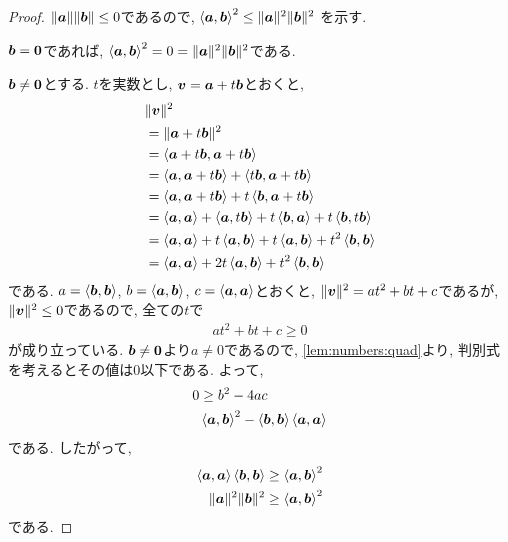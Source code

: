 \begin{proof}
  $\|\aaa\|\|\bbb\|\leq 0$であるので,
  $\Braket{\aaa,\bbb}^2\leq \|\aaa\|^2\|\bbb\|^2$
  を示す.

  $\bbb=\zzero$であれば,  $\Braket{\aaa,\bbb}^2=0=\|\aaa\|^2\|\bbb\|^2$である.

  $\bbb\neq \zzero$とする.
  $t$を実数とし,
  $\vv=\aaa+t\bbb$とおくと,
  \begin{align*}
    &\|\vv\|^2\\
    &=\|\aaa+t\bbb\|^2\\
    &=\Braket{\aaa+t\bbb,\aaa+t\bbb}\\
    &=\Braket{\aaa,\aaa+t\bbb}+\Braket{t\bbb,\aaa+t\bbb}\\
    &=\Braket{\aaa,\aaa+t\bbb}+t\Braket{\bbb,\aaa+t\bbb}\\
    &=\Braket{\aaa,\aaa}+\Braket{\aaa,t\bbb}+t\Braket{\bbb,\aaa}+t\Braket{\bbb,t\bbb}\\
    &=\Braket{\aaa,\aaa}+t\Braket{\aaa,\bbb}+t\Braket{\aaa,\bbb}+t^2\Braket{\bbb,\bbb}\\
    &=\Braket{\aaa,\aaa}+2t\Braket{\aaa,\bbb}+t^2\Braket{\bbb,\bbb}
  \end{align*}
  である.
  $a=\Braket{\bbb,\bbb}$,
  $b=\Braket{\aaa,\bbb}$, 
  $c=\Braket{\aaa,\aaa}$とおくと,
  $\|\vv\|^2=at^2+bt+c$であるが,
  $\|\vv\|^2\leq 0$であるので,
  全ての$t$で
  \begin{align*}
    at^2+bt+c \geq 0
  \end{align*}
  が成り立っている.
  $\bbb\neq\zzero$より$a\neq 0$であるので,
  \cref{lem:numbers:quad}より,
  判別式を考えるとその値は$0$以下である.
  よって,
  \begin{align*}
    0&\geq b^2-4ac\\
    &\Braket{\aaa,\bbb}^2-\Braket{\bbb,\bbb}\Braket{\aaa,\aaa}
  \end{align*}
  である. したがって,
  \begin{align*}
    \Braket{\aaa,\aaa}\Braket{\bbb,\bbb}&\geq\Braket{\aaa,\bbb}^2\\
    \|\aaa\|^2\|\bbb\|^2&\geq\Braket{\aaa,\bbb}^2
  \end{align*}
  である.
\end{proof}

